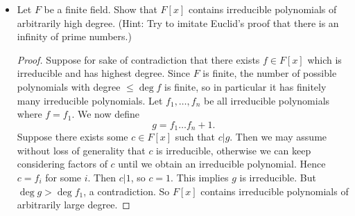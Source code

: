\begin{itemize}
\item [18.] Let $F$ be a finite field. Show that $F[x]$ contains irreducible polynomials of arbitrarily high degree. (Hint: Try to imitate Euclid's proof that there is an infinity of prime numbers.)
\begin{proof}
	Suppose for sake of contradiction that there exists $f \in F[x]$ which is irreducible and has highest degree. Since $F$ is finite, the number of possible polynomials with degree $\le \operatorname{deg} f$ is finite, so in particular it has finitely many irreducible polynomials. Let $f_1, \ldots, f_n$ be all irreducible polynomials where $f = f_1$. We now define
	\[
		g = f_1 \ldots f_n + 1
	.\] 
	Suppose there exists some $c \in F[x]$ such that $c | g$. Then we may assume without loss of generality that $c$ is irreducible, otherwise we can keep considering factors of $c$ until we obtain an irreducible polynomial. Hence $c = f_i$ for some $i$. Then $c | 1$, so $c = 1$. This implies $g$ is irreducible. But $\operatorname{deg} g > \operatorname{deg} f_1$, a contradiction. So $F[x]$ contains irreducible polynomials of arbitrarily large degree.
	\end{proof}

\end{itemize}
